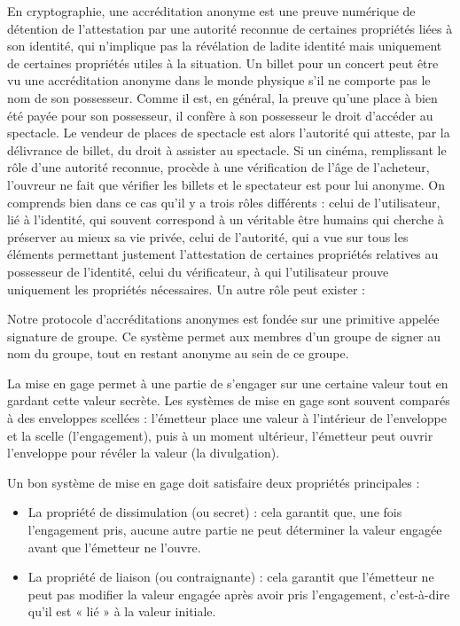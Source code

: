 En cryptographie, une accréditation anonyme est une preuve numérique de détention de l’attestation par une autorité reconnue de certaines propriétés liées à son identité, qui n’implique pas la révélation de ladite identité mais uniquement de certaines propriétés utiles à la situation. Un billet pour un concert peut être vu une accréditation anonyme dans le monde physique s’il ne comporte pas le nom de son possesseur. Comme il est, en général, la preuve qu’une place à bien été payée pour son possesseur, il confère à son possesseur le droit d’accéder au spectacle. Le vendeur de places de spectacle est alors l’autorité qui atteste, par la délivrance de billet, du droit à assister au spectacle. Si un cinéma, remplissant le rôle d’une autorité reconnue, procède à une vérification de l’âge de l’acheteur, l’ouvreur ne fait que vérifier les billets et le spectateur est pour lui anonyme. On comprends bien dans ce cas qu’il y a trois rôles différents : celui de l’utilisateur, lié à l’identité, qui souvent correspond à un véritable être humains qui cherche à préserver au mieux sa vie privée, celui de l’autorité, qui a vue sur tous les éléments permettant justement l’attestation de certaines propriétés relatives au possesseur de l’identité, celui du vérificateur, à qui l’utilisateur prouve uniquement les propriétés nécessaires. Un autre rôle peut exister :\par
Notre protocole d’accréditations anonymes est fondée sur une primitive appelée signature de groupe. Ce système permet aux membres d’un groupe de signer au nom du groupe, tout en restant anonyme au sein de ce groupe.\par 
La mise en gage permet à une partie de s'engager sur une certaine valeur tout en gardant cette valeur secrète. Les systèmes de mise en gage sont souvent comparés à des enveloppes scellées : l'émetteur place une valeur à l'intérieur de l'enveloppe et la scelle (l'engagement), puis à un moment ultérieur, l'émetteur peut ouvrir l'enveloppe pour révéler la valeur (la divulgation).\par

Un bon système de mise en gage doit satisfaire deux propriétés principales :
\begin{itemize}
  \item La propriété de dissimulation (ou secret) : cela garantit que, une fois l'engagement pris, aucune autre partie ne peut déterminer la valeur engagée avant que l'émetteur ne l'ouvre.
  \item La propriété de liaison (ou contraignante) : cela garantit que l'émetteur ne peut pas modifier la valeur engagée après avoir pris l'engagement, c'est-à-dire qu'il est « lié » à la valeur initiale.
\end{itemize}




\label{sec:accreditations}



